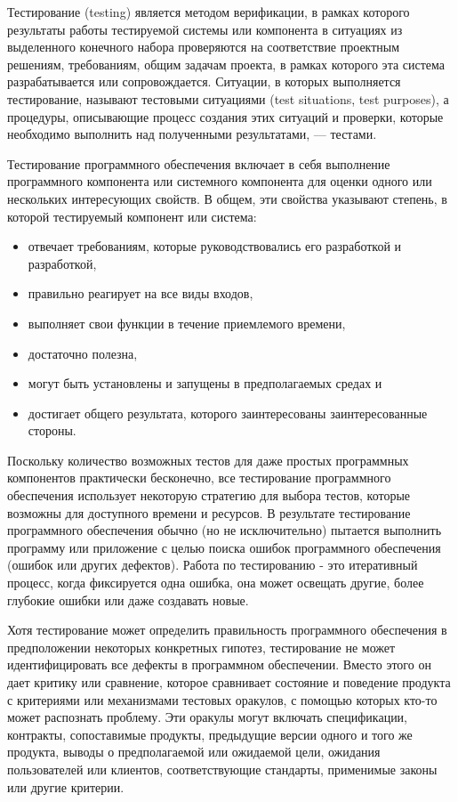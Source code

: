 Тестирование (testing) является методом верификации, в рамках которого результаты работы тестируемой системы или компонента в ситуациях из выделенного конечного набора проверяются на соответствие проектным решениям, требованиям, общим задачам проекта, в рамках которого эта система разрабатывается или сопровождается. Ситуации, в которых выполняется тестирование, называют тестовыми ситуациями (test situations, test purposes), а процедуры, описывающие процесс создания этих ситуаций и проверки, которые необходимо выполнить над полученными результатами, — тестами.

Тестирование программного обеспечения включает в себя выполнение программного компонента или системного компонента для оценки одного или нескольких интересующих свойств. В общем, эти свойства указывают степень, в которой тестируемый компонент или система:
\begin{itemize}
	\item отвечает требованиям, которые руководствовались его разработкой и разработкой,
	\item правильно реагирует на все виды входов,
	\item выполняет свои функции в течение приемлемого времени,
	\item достаточно полезна,
	\item могут быть установлены и запущены в предполагаемых средах и
	\item достигает общего результата, которого заинтересованы заинтересованные стороны.
\end{itemize}

Поскольку количество возможных тестов для даже простых программных компонентов практически бесконечно, все тестирование программного обеспечения использует некоторую стратегию для выбора тестов, которые возможны для доступного времени и ресурсов. В результате тестирование программного обеспечения обычно (но не исключительно) пытается выполнить программу или приложение с целью поиска ошибок программного обеспечения (ошибок или других дефектов). Работа по тестированию - это итеративный процесс, когда фиксируется одна ошибка, она может освещать другие, более глубокие ошибки или даже создавать новые.

Хотя тестирование может определить правильность программного обеспечения в предположении некоторых конкретных гипотез, тестирование не может идентифицировать все дефекты в программном обеспечении. Вместо этого он дает критику или сравнение, которое сравнивает состояние и поведение продукта с критериями или механизмами тестовых оракулов, с помощью которых кто-то может распознать проблему. Эти оракулы могут включать спецификации, контракты, сопоставимые продукты, предыдущие версии одного и того же продукта, выводы о предполагаемой или ожидаемой цели, ожидания пользователей или клиентов, соответствующие стандарты, применимые законы или другие критерии.


